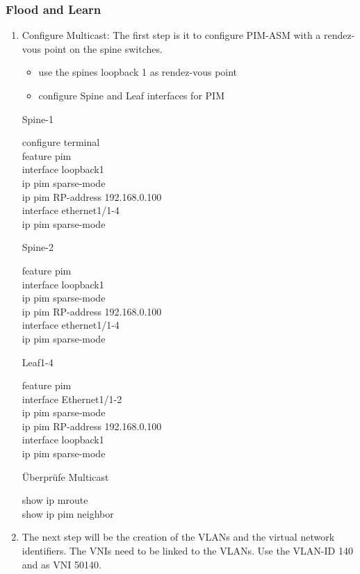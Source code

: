 \documentclass[11pt,titlepage]{article}
\newenvironment{shadedquotation}
 {\begin{shaded*}
  \quoting[leftmargin=0pt, vskip=0pt]
 }
 {\endquoting
 \end{shaded*}
}
\begin{document}
\subsubsection{Flood and Learn}
\begin{enumerate}
	\item Configure Multicast: The first step is it to configure PIM-ASM with a rendez-vous point on the spine switches.
	\begin{itemize}
		\item use the spines loopback 1 as rendez-vous point
		\item configure Spine and Leaf interfaces for PIM
	\end{itemize}
	Spine-1
	\begin{shadedquotation}
		configure terminal \\
		feature pim \\
		interface loopback1 \\
		ip pim sparse-mode \\
		ip pim RP-address 192.168.0.100 \\
		interface ethernet1/1-4 \\
		ip pim sparse-mode \\
	\end{shadedquotation}
	Spine-2
	\begin{shadedquotation}
		feature pim \\
		interface loopback1 \\
		ip pim sparse-mode \\
		ip pim RP-address 192.168.0.100 \\
		interface ethernet1/1-4 \\
		ip pim sparse-mode
	\end{shadedquotation}
	Leaf1-4
	\begin{shadedquotation}
		feature pim \\
		interface Ethernet1/1-2 \\
		ip pim sparse-mode \\
		ip pim RP-address 192.168.0.100 \\
		interface loopback1 \\
		ip pim sparse-mode
	\end{shadedquotation}
	Überprüfe Multicast
	\begin{shadedquotation}
		show ip mroute \\
		show ip pim neighbor \\
	\end{shadedquotation}
\item The next step will be the creation of the VLANs and the virtual network identifiers. The VNIs need to be linked to the VLANs. Use the VLAN-ID 140 and as VNI 50140.

\end{enumerate}
\end{document}
